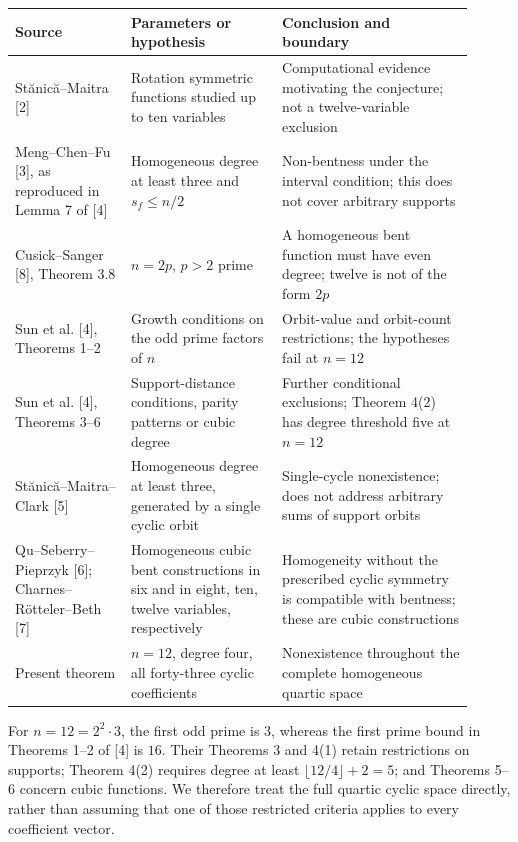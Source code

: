 \documentclass[11pt,a4paper]{article}
\begin{document}
{\footnotesize
\setlength{\tabcolsep}{3pt}

\begin{longtable}{@{}>{\raggedright\arraybackslash}p{0.23\linewidth}>{\raggedright\arraybackslash}p{0.3\linewidth}>{\raggedright\arraybackslash}p{0.38\linewidth}@{}}
\toprule
Source & Parameters or hypothesis & Conclusion and boundary \\
\midrule\endhead
St\u{a}nic\u{a}--Maitra [2] & Rotation symmetric functions studied up to ten variables & Computational evidence motivating the conjecture; not a twelve-variable exclusion \\
Meng--Chen--Fu [3], as reproduced in Lemma 7 of [4] & Homogeneous degree at least three and $s_f\le n/2$ & Non-bentness under the interval condition; this does not cover arbitrary supports \\
Cusick--Sanger [8], Theorem 3.8 & $n=2p$, $p>2$ prime & A homogeneous bent function must have even degree; twelve is not of the form $2p$ \\
Sun et al. [4], Theorems 1--2 & Growth conditions on the odd prime factors of $n$ & Orbit-value and orbit-count restrictions; the hypotheses fail at $n=12$ \\
Sun et al. [4], Theorems 3--6 & Support-distance conditions, parity patterns or cubic degree & Further conditional exclusions; Theorem 4(2) has degree threshold five at $n=12$ \\
St\u{a}nic\u{a}--Maitra--Clark [5] & Homogeneous degree at least three, generated by a single cyclic orbit & Single-cycle nonexistence; does not address arbitrary sums of support orbits \\
Qu--Seberry--Pieprzyk [6]; Charnes--Rötteler--Beth [7] & Homogeneous cubic bent constructions in six and in eight, ten, twelve variables, respectively & Homogeneity without the prescribed cyclic symmetry is compatible with bentness; these are cubic constructions \\
Present theorem & $n=12$, degree four, all forty-three cyclic coefficients & Nonexistence throughout the complete homogeneous quartic space \\
\bottomrule
\end{longtable}

}

For $n=12=2^2\cdot3$, the first odd prime is $3$, whereas the first prime bound in Theorems 1--2 of [4] is $16$. Their Theorems 3 and 4(1) retain restrictions on supports; Theorem 4(2) requires degree at least $\lfloor12/4\rfloor+2=5$; and Theorems 5--6 concern cubic functions. We therefore treat the full quartic cyclic space directly, rather than assuming that one of those restricted criteria applies to every coefficient vector.
\end{document}
